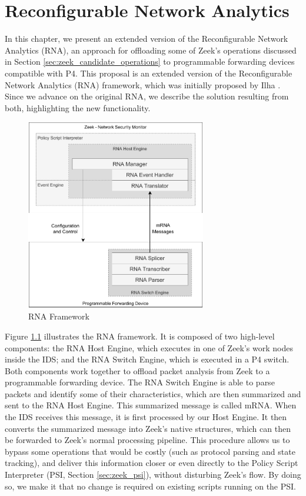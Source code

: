 \chapter{Reconfigurable Network Analytics}
\label{cap:rna}

In this chapter, we present an extended version of the Reconfigurable Network Analytics (RNA), an approach for offloading some of Zeek's operations discussed in Section \ref{sec:zeek_candidate_operations} to programmable forwarding devices compatible with P4. This proposal is an extended version of the Reconfigurable Network Analytics (RNA) framework, which was initially proposed by Ilha \cite{Ilha2022}. Since we advance on the original RNA, we describe the solution resulting from both, highlighting the new functionality.

\begin{figure}[h]
    \caption{RNA Framework}
    \begin{center}
        \includegraphics[width=0.7\textwidth]{images/arch_high_level.pdf}  
    \end{center}
    \label{fig:arch_high_level}
\end{figure}

Figure \ref{fig:arch_high_level} illustrates the RNA framework. It is composed of two high-level components: the RNA Host Engine, which executes in one of Zeek's work nodes inside the IDS; and the RNA Switch Engine, which is executed in a P4 switch. Both components work together to offload packet analysis from Zeek to a programmable forwarding device. The RNA Switch Engine is able to parse packets and identify some of their characteristics, which are then summarized and sent to the RNA Host Engine. This summarized message is called mRNA. When the IDS receives this message, it is first processed by our Host Engine. It then converts the summarized message into Zeek's native structures, which can then be forwarded to Zeek's normal processing pipeline. This procedure allows us to bypass some operations that would be costly (such as protocol parsing and state tracking), and deliver this information closer or even directly to the Policy Script Interpreter (PSI, Section \ref{sec:zeek_psi}), without disturbing Zeek's flow. By doing so, we make it that no change is required on existing scripts running on the PSI.

